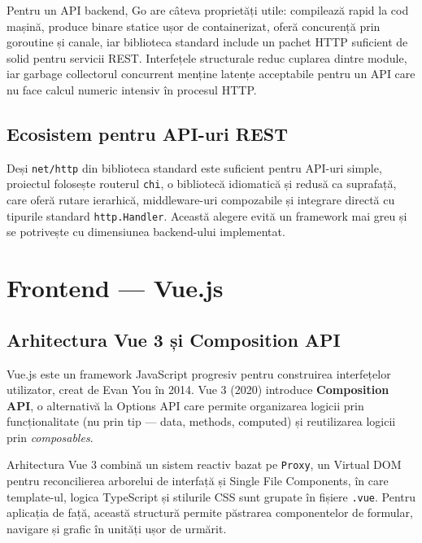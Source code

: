 Pentru un API backend, Go are câteva proprietăți utile: compilează rapid la cod
mașină, produce binare statice ușor de containerizat, oferă concurență prin
goroutine și canale, iar biblioteca standard include un pachet HTTP suficient de
solid pentru servicii REST. Interfețele structurale reduc cuplarea dintre module,
iar garbage collectorul concurrent menține latențe acceptabile pentru un API care
nu face calcul numeric intensiv în procesul HTTP.

\subsection{Ecosistem pentru API-uri REST}
\label{subsec:go_api}

Deși \texttt{net/http} din biblioteca standard este suficient pentru API-uri simple,
proiectul folosește routerul \texttt{chi}, o bibliotecă idiomatică și redusă ca
suprafață, care oferă rutare ierarhică, middleware-uri compozabile și integrare
directă cu tipurile standard \texttt{http.Handler}. Această alegere evită un
framework mai greu și se potrivește cu dimensiunea backend-ului implementat.

\section{Frontend — Vue.js}
\label{sec:vuejs}

\subsection{Arhitectura Vue 3 și Composition API}
\label{subsec:vue_arhitectura}

Vue.js \cite{vuejs2024} este un framework JavaScript progresiv pentru construirea
interfețelor utilizator, creat de Evan You în 2014. Vue 3 (2020) introduce
\textbf{Composition API}, o alternativă la Options API care permite organizarea
logicii prin funcționalitate (nu prin tip --- data, methods, computed) și
reutilizarea logicii prin \emph{composables}.

Arhitectura Vue 3 combină un sistem reactiv bazat pe \texttt{Proxy}, un Virtual DOM
pentru reconcilierea arborelui de interfață și Single File Components, în care
template-ul, logica TypeScript și stilurile CSS sunt grupate în fișiere
\texttt{.vue}. Pentru aplicația de față, această structură permite păstrarea
componentelor de formular, navigare și grafic în unități ușor de urmărit.

